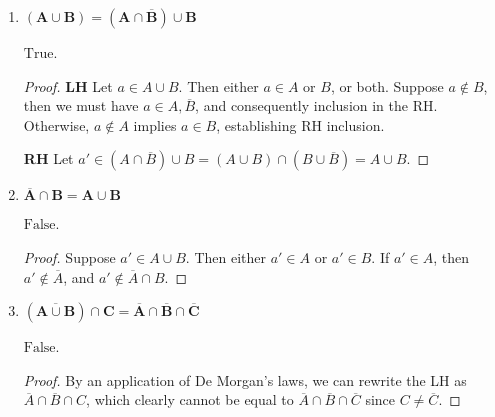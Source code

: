 \documentclass[10pt, oneside]{article}   	%
\theoremstyle{definition}
\begin{document}
\begin{enumerate}[label=1.\arabic*]
\begin{enumerate}
\begin{proof}
	\textbf{RH}. Let $a' \in A \cup (B \cap C)$. Then $a' \in A$ or $a' \in B \cap C$ or both. If $a' \in A$, then $a' \in A \cup B, A \cup C$, so $a' \in (A \cup B) \cap (A \cup C)$. If $a' \in B \cap C$, then $a' \in B, C$, so $a' \in A \cup B, A \cup C$, so $a' \in (A \cup B) \cap (A \cup C)$.
	\end{proof}

	\item  \begin{tcolorbox}[
	  colback=Cerulean!5!white,
	  colframe=Cerulean!75!black]
	\textbf{$\bm{(A \cup B) = (A \cap \overline{B}) \cup B}$}
	\end{tcolorbox}
	
	$\boxed{\text{True}}$.
	
	\begin{proof}
	\textbf{LH} Let $a \in A \cup B$. Then either $a \in A$ or $B$, or both. Suppose $a \notin B$, then we must have $a \in A, \overline{B}$, and consequently inclusion in the RH. Otherwise, $a \notin A$ implies $a \in B$, establishing RH inclusion.
	
	\textbf{RH} Let $a' \in (A \cap \overline{B}) \cup B = (A \cup B) \cap (B \cup \overline{B}) = A \cup B$.
	\end{proof}
	
	\item  \begin{tcolorbox}[
	  colback=Cerulean!5!white,
	  colframe=Cerulean!75!black]
	\textbf{$\bm{\overline{A} \cap B = A \cup B}$}
	\end{tcolorbox}
	
	$\boxed{\text{False}}$.
	
	\begin{proof}
	Suppose $a' \in A \cup B$. Then either $a' \in A$ or $a' \in B$. If $a' \in A$, then $a' \notin \overline{A}$, and $a' \notin \overline{A} \cap B$.
	\end{proof}
	
	\item  \begin{tcolorbox}[
	  colback=Cerulean!5!white,
	  colframe=Cerulean!75!black]
	\textbf{$\bm{(\overline{A \cup B}) \cap C = \overline{A} \cap \overline{B} \cap \overline{C}}$}
	\end{tcolorbox}
	
	$\boxed{\text{False}}$.
	
	\begin{proof}
	By an application of De Morgan's laws, we can rewrite the LH as $\overline{A} \cap \overline{B} \cap C$, which clearly cannot be equal to $\overline{A} \cap \overline{B} \cap \overline{C}$ since $C \neq \overline{C}$.
	\end{proof}
	

\end{enumerate}
\end{enumerate}
\end{document}
